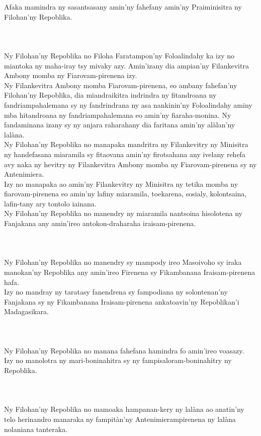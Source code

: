 \documentclass[12pt]{article}
\newcounter{laharana}
\newcommand{\andininy}[0]{
  \paragraph{%
    \NoCaseChange{%
      Andininy~\addtocounter{laharana}{1}\thelaharana.}\label{and:\thelaharana}~%
  }%
}
\begin{document}
\noindent
Afaka mamindra ny sasantsasany amin'ny fahefany amin'ny Praiminisitra ny
Filohan'ny Repoblika.

\andininy{}Ny Filohan'ny Repoblika no Filoha Faratampon'ny Foloalindahy ka izy
no miantoka ny maha-iray tsy mivaky azy. Amin'izany dia ampian'ny Filankevitra
Ambony momba ny Fiarovam-pirenena izy.\\

\noindent
Ny Filankevitra Ambony momba Fiarovam-pirenena, eo ambany fahefan'ny Filohan'ny
Repoblika, dia miandraikitra indrindra ny fitandroana ny fandriampahalemana sy
ny fandrindrana ny asa nankinin'ny Foloalindahy aminy mba hitandroana ny
fandriampahalemana eo amin'ny fiaraha-monina. Ny fandaminana izany sy ny anjara
raharahany dia faritana amin'ny alàlan'ny lalàna.\\

\noindent
Ny Filohan'ny Repoblika no manapaka mandritra ny Filankevitry ny Minisitra ny
handefasana miaramila sy fitaovana amin'ny firotsahana any ivelany rehefa avy
naka ny hevitry ny Filankevitra Ambony momba ny Fiarovam-pirenena sy ny
Antenimiera.\\

\noindent
Izy no manapaka ao amin'ny Filankevitry ny Minisitra ny tetika momba ny
fiarovam-pirenena eo amin'ny lafiny miaramila, toekarena, sosialy, kolontsaina,
lafin-tany ary tontolo iainana.\\

\noindent
Ny Filohan'ny Repoblika no manendry ny miaramila nantsoina hisolotena ny
Fanjakana any amin'ireo antokon-draharaha iraisam-pirenena.

\andininy{}Ny Filohan'ny Repoblika no manendry sy mampody ireo Masoivoho sy
iraka manokan'ny Repoblika any amin'ireo Firenena sy Fikambanana
Iraisam-pirenena hafa.\\

\noindent
Izy no mandray ny taratasy fanendrena sy fampodiana ny solontenan'ny Fanjakana
sy ny Fikambanana Iraisam-pirenena ankatoavin'ny Repoblikan'i Madagasikara.

\andininy{}Ny Filohan'ny Repoblika no manana fahefana hamindra fo amin'ireo
voasazy.\\

\noindent
Izy no manolotra ny mari-boninahitra sy ny fampisaloram-boninahitry ny
Repoblika.

\andininy{}Ny Filohan'ny Repoblika no mamoaka hampanan-kery ny lalàna ao
anatin'ny telo herinandro manaraka ny fampitàn'ny Antenimierampirenena ny lalàna
nolaniana tanteraka.\\
\end{document}
